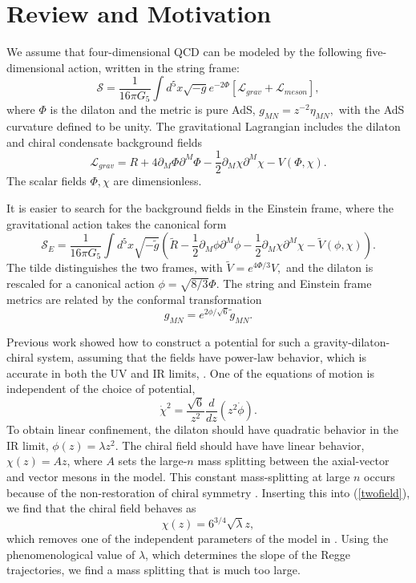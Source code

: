 \documentclass[aps,prd,12pt,nofootinbib]{revtex4}
\newcommand{\be}{\begin{equation}}
\newcommand{\ee}{\end{equation}}
\def\thalf{{\textstyle{\frac{1}{2}}}}
\def\Dz{\frac{d}{dz}}
\def\phidot{\dot{\phi}}
\def\chidot{\dot{\chi}}
\def\rt6{\sqrt{6}}
\newcommand{\cL}{\mathcal L}
\newcommand{\cS}{\mathcal S}
\begin{document}
\section{Review and Motivation}
\label{secReview}

We assume that four-dimensional QCD can be modeled by the following five-dimensional action, written in the string frame:
\be
\cS =\frac{1}{16\pi G_5} \int d^5x \sqrt{-g} e^{-2\Phi}  \left[ \cL_{grav} + \cL_{meson} \right], 
\label{eqStringAction}
\ee
where $\Phi$ is the dilaton and the metric is pure AdS, $g_{MN}=z^{-2}\eta_{MN},$ with the AdS curvature defined to be unity.
The gravitational Lagrangian includes the dilaton and chiral condensate background fields
\be
\cL_{grav}=R+4\partial_M\Phi\partial^M\Phi - \thalf\partial_M\chi\partial^M\chi -V(\Phi,\chi).
\ee
The scalar fields $\Phi,\chi$ are dimensionless. 

It is easier to search for the background fields in the Einstein frame, where the gravitational action takes the canonical form
\be
\cS_E=\frac{1}{16\pi G_5} \int d^5x \sqrt{-\tilde{g}}\left(\tilde{R}-\thalf\partial_M\phi\partial^M\phi -\thalf\partial_M\chi\partial^M\chi - \tilde{V}(\phi,\chi)\right).
\ee
The tilde distinguishes the two frames, with $\tilde{V}=e^{4\Phi/3}V,$ and the dilaton is rescaled for a canonical action $\phi=\sqrt{8/3}\Phi$.
The string and Einstein frame metrics are related by the conformal transformation
\be
g_{MN}=e^{2\phi/\sqrt{6}}\tilde{g}_{MN}.
\ee

Previous work showed how to construct a potential for such a gravity-dilaton-chiral system, assuming that the fields have power-law behavior, which is accurate in both the UV and IR limits, \cite{Springer 2010}. 
One of the equations of motion is independent of the choice of potential,
\be
\chidot^2  = \frac{\rt6}{z^2} \Dz(z^2\phidot). 
\label{twofield}
\ee
To obtain linear confinement, the dilaton should have quadratic behavior in the IR limit, $\phi(z)=\lambda z^2$.
The chiral field should have have linear behavior, $\chi(z)=A z$, where $A$ sets the large-$n$ mass splitting between the axial-vector and vector mesons in the model. 
This constant mass-splitting at large $n$ occurs because of the non-restoration of chiral symmetry \cite{Shifman-2008}.
Inserting this into (\ref{twofield}), we find that the chiral field behaves as
\be
\chi(z)=6^{3/4}\sqrt{\lambda}z,
\ee
which removes one of the independent parameters of the model in \cite{gherghetta-kelley}. 
Using the phenomenological value of $\lambda$, which determines the slope of the Regge trajectories, we find a mass splitting that is much too large.
\end{document}
